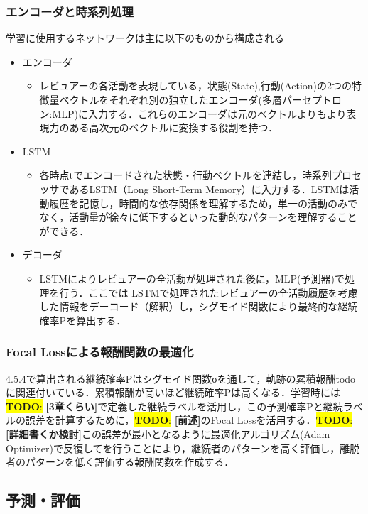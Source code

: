 \documentclass[submit,techrep,noauthor]{ipsj}
\newcommand{\todo}[1]{\colorbox{yellow}{{\bf TODO}:}{\color{red} {\textbf{[#1]}}}}
\begin{document}
\subsubsection{エンコーダと時系列処理}
学習に使用するネットワークは主に以下のものから構成される
\begin{itemize}
    \item エンコーダ
    \begin{itemize}
        \item レビュアーの各活動を表現している，状態(State),行動(Action)の2つの特徴量ベクトルをそれぞれ別の独立したエンコーダ(多層パーセプトロン:MLP)に入力する．これらのエンコーダは元のベクトルよりもより表現力のある高次元のベクトルに変換する役割を持つ．
    \end{itemize}
    \item LSTM
        \begin{itemize}
    \item 各時点tでエンコードされた状態・行動ベクトルを連結し，時系列プロセッサであるLSTM（Long Short-Term Memory）に入力する．LSTMは活動履歴を記憶し，時間的な依存関係を理解するため，単一の活動のみでなく，活動量が徐々に低下するといった動的なパターンを理解することができる．
    \end{itemize}
    \item デコーダ
    \begin{itemize}
        \item  LSTMによりレビュアーの全活動が処理された後に，MLP(予測器)で処理を行う．ここでは LSTMで処理されたレビュアーの全活動履歴を考慮した情報をデーコード（解釈）し，シグモイド関数により最終的な継続確率Pを算出する．
    \end{itemize}
\end{itemize}
\subsubsection{Focal Lossによる報酬関数の最適化}
4.5.4で算出される継続確率Pはシグモイド関数σを通して，軌跡の累積報酬todoに関連付いている．累積報酬が高いほど継続確率Pは高くなる．学習時には\todo{3章くらい}で定義した継続ラベルを活用し，この予測確率Pと継続ラベルの誤差を計算するために，\todo{前述}のFocal Lossを活用する．\todo{詳細書くか検討}この誤差が最小となるように最適化アルゴリズム(Adam Optimizer)で反復してを行うことにより，継続者のパターンを高く評価し，離脱者のパターンを低く評価する報酬関数を作成する．




\subsection{予測・評価}
\end{document}
